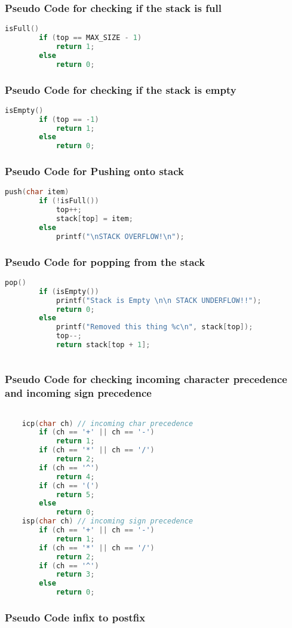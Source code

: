 \documentclass[11pt]{article}
\begin{document}
\subsubsection{Pseudo Code for checking if the stack is full}
\begin{lstlisting}[language=C]
	isFull()
		if (top == MAX_SIZE - 1)
			return 1;
		else
			return 0;
\end{lstlisting}\subsubsection{Pseudo Code for checking if the stack is empty}

\begin{lstlisting}[language=C]
	isEmpty()
		if (top == -1)
			return 1;
		else
			return 0;
\end{lstlisting}\subsubsection{Pseudo Code for Pushing onto stack}

\begin{lstlisting}[language=C]
	push(char item)
		if (!isFull())
			top++;
			stack[top] = item;
		else
			printf("\nSTACK OVERFLOW!\n");
\end{lstlisting}\subsubsection{Pseudo Code for popping from the stack}

\begin{lstlisting}[language=C]
	pop()
		if (isEmpty())
			printf("Stack is Empty \n\n STACK UNDERFLOW!!");
			return 0;
		else
			printf("Removed this thing %c\n", stack[top]);
			top--;
			return stack[top + 1];
	
\end{lstlisting}\subsubsection{Pseudo Code for checking incoming character precedence and incoming sign precedence}

\begin{lstlisting}[language=C]

	icp(char ch) // incoming char precedence
		if (ch == '+' || ch == '-')
			return 1;
		if (ch == '*' || ch == '/')
			return 2;
		if (ch == '^')
			return 4;
		if (ch == '(')
			return 5;
		else
			return 0;
	isp(char ch) // incoming sign precedence
		if (ch == '+' || ch == '-')
			return 1;
		if (ch == '*' || ch == '/')
			return 2;
		if (ch == '^')
			return 3;
		else
			return 0;
\end{lstlisting}\subsubsection{Pseudo Code infix to postfix}
\end{document}
